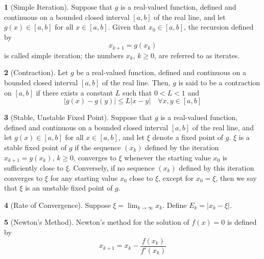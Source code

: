 \documentclass[12pt]{article}
\theoremstyle{definition}
\newtheorem{definition}{\color{NavyBlue}{\textbf{Definition}}}
\begin{document}
\begin{definition}[Simple Iteration]
Suppose that $g$ is a real-valued function, defined and continuous on a bounded closed interval $[a,b]$ of the real line, and let $g(x) \in [a,b]$ for all $x \in [a,b]$. Given that $x_0 \in [a,b]$, the recursion defined by
\begin{equation}
x_{k+1} = g(x_k)
\end{equation}
is called simple iteration; the numbers $x_k$, $k \geq 0$, are referred to as iterates.
\end{definition}

\begin{definition}[Contraction]
Let $g$ be a real-valued function, defined and continuous on a bounded closed interval $[a,b]$ of the real line. Then, $g$ is said to be a contraction on $[a,b]$ if there exists a constant $L$ such that $0<L<1$ and
\begin{equation}
|g(x)-g(y)| \leq L|x-y| \quad \forall x,y \in [a,b]
\end{equation}
\end{definition}

\begin{definition}[Stable, Unstable Fixed Point]
Suppose that $g$ is a real-valued function, defined and continuous on a bounded closed interval $[a,b]$ of the real line, and let $g(x) \in [a,b]$ for all $x \in [a,b]$, and let $\xi$ denote a fixed point of $g$. $\xi$ is a stable fixed point of $g$ if the sequence $(x_k)$ defined by the iteration $x_{k+1} = g(x_k)$, $k\geq 0$, converges to $\xi$ whenever the starting value $x_0$ is sufficiently close to $\xi$. Conversely, if no sequence $(x_k)$ defined by this iteration converges to $\xi$ for any starting value $x_0$ close to $\xi$, except for $x_0 = \xi$, then we say that $\xi$ is an unstable fixed point of $g$.
\end{definition}

\begin{definition}[Rate of Convergence]
Suppose $\xi = \lim_{k \to \infty} x_k$. Define $E_k = |x_k - \xi|$.
\end{definition}

\begin{definition}[Newton's Method]
Newton's method for the solution of $f(x) = 0$ is defined by
\begin{equation}
x_{k+1} = x_k - \frac{f(x_k)}{f'(x_k)}
\end{equation}
\end{definition}
\end{document}
